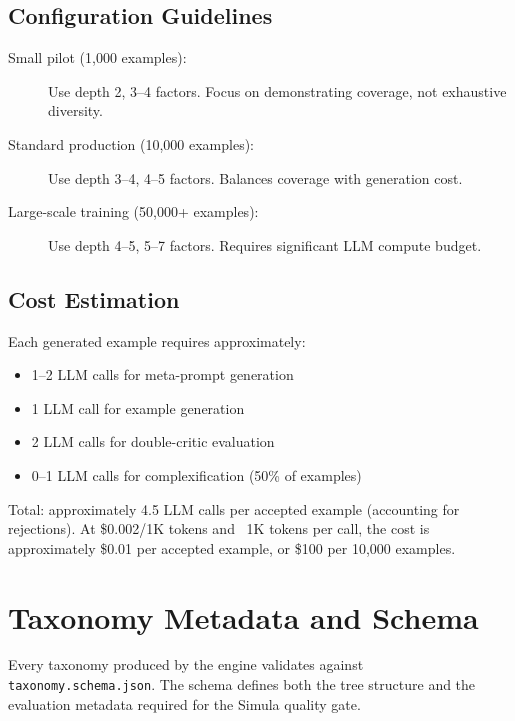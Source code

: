\subsection{Configuration Guidelines}

\begin{description}
  \item[Small pilot (1,000 examples):] Use depth 2, 3--4 factors. Focus on 
        demonstrating coverage, not exhaustive diversity.
  \item[Standard production (10,000 examples):] Use depth 3--4, 4--5 factors.
        Balances coverage with generation cost.
  \item[Large-scale training (50,000+ examples):] Use depth 4--5, 5--7 factors.
        Requires significant LLM compute budget.
\end{description}

\subsection{Cost Estimation}

Each generated example requires approximately:
\begin{itemize}
  \item 1--2 LLM calls for meta-prompt generation
  \item 1 LLM call for example generation
  \item 2 LLM calls for double-critic evaluation
  \item 0--1 LLM calls for complexification (50\% of examples)
\end{itemize}

\noindent
Total: approximately 4.5 LLM calls per accepted example (accounting for rejections).
At \$0.002/1K tokens and ~1K tokens per call, the cost is approximately
\$0.01 per accepted example, or \$100 per 10,000 examples.

\section{Taxonomy Metadata and Schema}\label{sec:taxonomy-schema}

Every taxonomy produced by the engine validates against \texttt{taxonomy.schema.json}.
The schema defines both the tree structure and the evaluation metadata required
for the Simula quality gate.


